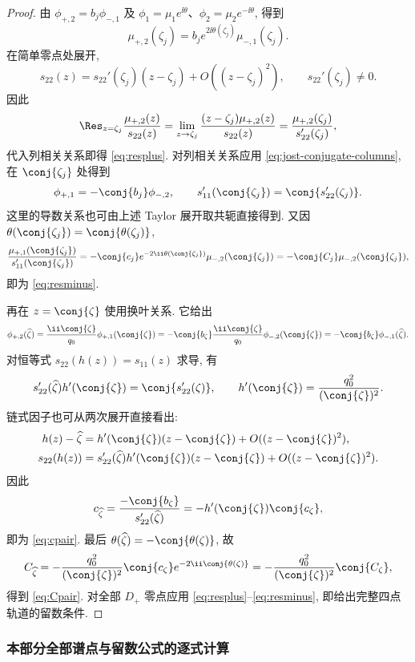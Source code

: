 \begin{proof}
由 $\phi_{+,2}=b_j\phi_{-,1}$ 及 $\phi_1=\mu_1e^{\ii\theta}$、$\phi_2=\mu_2e^{-\ii\theta}$, 得到
\[
\mu_{+,2}(\zeta_j)=b_je^{2\ii\theta(\zeta_j)}\mu_{-,1}(\zeta_j).
\]
在简单零点处展开,
\[
s_{22}(z)=s_{22}'(\zeta_j)(z-\zeta_j)+O((z-\zeta_j)^2),\qquad
s_{22}'(\zeta_j)\ne0.
\]
因此
\[
\Res_{z=\zeta_j}\dfrac{\mu_{+,2}(z)}{s_{22}(z)}
=\lim\limits_{z\to\zeta_j}\dfrac{(z-\zeta_j)\mu_{+,2}(z)}{s_{22}(z)}
=\dfrac{\mu_{+,2}(\zeta_j)}{s_{22}'(\zeta_j)},
\]
代入列相关关系即得 \eqref{eq:resplus}. 对列相关关系应用 \eqref{eq:jost-conjugate-columns}, 在 $\conj{\zeta_j}$ 处得到
\[
\phi_{+,1}=-\conj{b_j}\phi_{-,2},\qquad
s_{11}'(\conj{\zeta_j})=\conj{s_{22}'(\zeta_j)}.
\]
这里的导数关系也可由上述 Taylor 展开取共轭直接得到. 又因 $\theta(\conj{\zeta_j})=\conj{\theta(\zeta_j)}$,
\[
\dfrac{\mu_{+,1}(\conj{\zeta_j})}{s_{11}'(\conj{\zeta_j})}
=-\conj{c_j}e^{-2\ii\theta(\conj{\zeta_j})}
\mu_{-,2}(\conj{\zeta_j})
=-\conj{C_j}\mu_{-,2}(\conj{\zeta_j}),
\]
即为 \eqref{eq:resminus}.

再在 $z=\conj{\zeta}$ 使用换叶关系. 它给出
\[
\phi_{+,2}(\widehat\zeta)
=\dfrac{\ii\conj{\zeta}}{q_0}\phi_{+,1}(\conj{\zeta})
=-\conj{b_\zeta}\dfrac{\ii\conj{\zeta}}{q_0}\phi_{-,2}(\conj{\zeta})
=-\conj{b_\zeta}\phi_{-,1}(\widehat\zeta).
\]
对恒等式 $s_{22}(h(z))=s_{11}(z)$ 求导, 有
\[
s_{22}'(\widehat\zeta)h'(\conj{\zeta})=\conj{s_{22}'(\zeta)},\qquad
h'(\conj{\zeta})=\dfrac{q_0^2}{(\conj{\zeta})^2}.
\]
链式因子也可从两次展开直接看出:
\[
\begin{aligned}
h(z)-\widehat\zeta
&=h'(\conj{\zeta})(z-\conj{\zeta})+O((z-\conj{\zeta})^2),\\
s_{22}(h(z))
&=s_{22}'(\widehat\zeta)h'(\conj{\zeta})(z-\conj{\zeta})+O((z-\conj{\zeta})^2).
\end{aligned}
\]
因此
\[
c_{\widehat\zeta}
=\dfrac{-\conj{b_\zeta}}{s_{22}'(\widehat\zeta)}
=-h'(\conj{\zeta})\conj{c_\zeta},
\]
即为 \eqref{eq:cpair}. 最后 $\theta(\widehat\zeta)=-\conj{\theta(\zeta)}$, 故
\[
C_{\widehat\zeta}
=-\dfrac{q_0^2}{(\conj{\zeta})^2}\conj{c_\zeta}
e^{-2\ii\conj{\theta(\zeta)}}
=-\dfrac{q_0^2}{(\conj{\zeta})^2}\conj{C_\zeta},
\]
得到 \eqref{eq:Cpair}. 对全部 $D_+$ 零点应用 \eqref{eq:resplus}--\eqref{eq:resminus}, 即给出完整四点轨道的留数条件.
\end{proof}


\subsubsection*{本部分全部谱点与留数公式的逐式计算}
